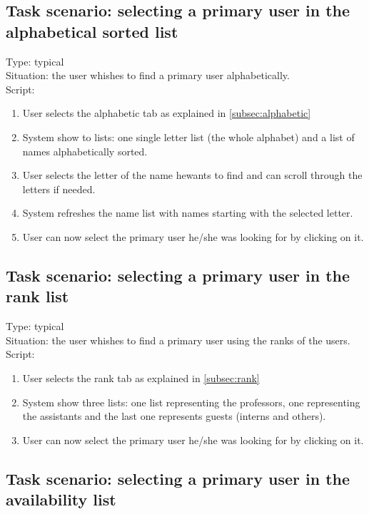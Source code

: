 \documentclass[11pt, a4paper,svglistings]{report}
\begin{document}
\subsection{Task scenario: selecting a primary user in the alphabetical sorted list}


\label{subsec:alphabeticSelect}Type: typical \\
Situation: the user whishes to find a primary user alphabetically. \\
Script:
\begin{enumerate}
\item User selects the alphabetic tab as explained in \ref{subsec:alphabetic}
\item System show to lists: one single letter list (the whole alphabet) and a list of names alphabetically sorted.
\item User selects the letter of the name hewants to find and can scroll through the letters if needed.
\item System refreshes the name list with names starting with the selected letter.
\item User can now select the primary user he/she was looking for by clicking on it.
\end{enumerate}


\subsection{Task scenario: selecting a primary user in the rank list}


\label{subsec:rankSelect}Type: typical \\
Situation: the user whishes to find a primary user using the ranks of the users. \\
Script:
\begin{enumerate}
\item User selects the rank tab as explained in \ref{subsec:rank}
\item System show three lists: one list representing the professors, one representing the assistants and the last one represents guests (interns and others).
\item User can now select the primary user he/she was looking for by clicking on it.
\end{enumerate}


\subsection{Task scenario: selecting a primary user in the availability list}
\end{document}
